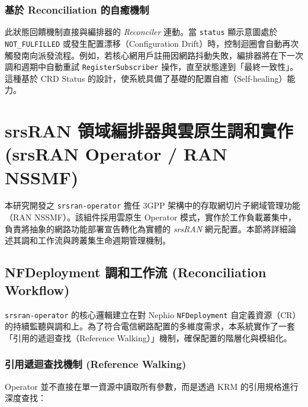 \subsubsection{基於 Reconciliation 的自癒機制}
此狀態回饋機制直接與編排器的 \textit{Reconciler} 連動。當 \texttt{status} 顯示意圖處於 \texttt{NOT\_FULFILLED} 或發生配置漂移（Configuration Drift）時，控制迴圈會自動再次觸發南向派發流程。例如，若核心網用戶註冊因網路抖動失敗，編排器將在下一次調和週期中自動重試 \texttt{RegisterSubscriber} 操作，直至狀態達到「最終一致性」。這種基於 CRD Status 的設計，使系統具備了基礎的配置自癒（Self-healing）能力。

\section{srsRAN 領域編排器與雲原生調和實作 (srsRAN Operator / RAN NSSMF)}
\label{sec:ran_nssmf_implementation}

本研究開發之 \texttt{srsran-operator} 擔任 3GPP 架構中的存取網切片子網域管理功能（RAN NSSMF）。該組件採用雲原生 Operator 模式，實作於工作負載叢集中，負責將抽象的網路功能部署宣告轉化為實體的 \textit{srsRAN} 網元配置。本節將詳細論述其調和工作流與跨叢集生命週期管理機制。

\subsection{NFDeployment 調和工作流 (Reconciliation Workflow)}
\label{subsec:nfdeployment_workflow}

\texttt{srsran-operator} 的核心邏輯建立在對 Nephio \texttt{NFDeployment} 自定義資源（CR）的持續監聽與調和上。為了符合電信網路配置的多維度需求，本系統實作了一套「引用的遞迴查找（Reference Walking）」機制，確保配置的階層化與模組化。

\subsubsection{引用遞迴查找機制 (Reference Walking)}
Operator 並不直接在單一資源中讀取所有參數，而是透過 KRM 的引用規格進行深度查找：


